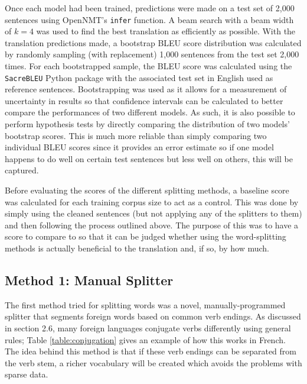\documentclass[11pt]{article}
\begin{document}
Once each model had been trained, predictions were made on a test set of 2,000 sentences using OpenNMT’s \texttt{infer} function. A beam search with a beam width of $k = 4$ was used to find the best translation as efficiently as possible. With the translation predictions made, a bootstrap BLEU score distribution was calculated by randomly sampling (with replacement) 1,000 sentences from the test set 2,000 times. For each bootstrapped sample, the BLEU score was calculated using the \texttt{SacreBLEU} Python package \citep{post-2018-call} with the associated test set in English used as reference sentences. Bootstrapping was used as it allows for a measurement of uncertainty in results so that confidence intervals can be calculated to better compare the performances of two different models. As such, it is also possible to perform hypothesis tests by directly comparing the distribution of two models’ bootstrap scores. This is much more reliable than simply comparing two individual BLEU scores since it provides an error estimate so if one model happens to do well on certain test sentences but less well on others, this will be captured.

\bigskip

Before evaluating the scores of the different splitting methods, a baseline score was calculated for each training corpus size to act as a control. This was done by simply using the cleaned sentences (but not applying any of the splitters to them) and then following the process outlined above. The purpose of this was to have a score to compare to so that it can be judged whether using the word-splitting methods is actually beneficial to the translation and, if so, by how much.

\subsection{Method 1: Manual Splitter}

The first method tried for splitting words was a novel, manually-programmed splitter that segments foreign words based on common verb endings. As discussed in section 2.6, many foreign languages conjugate verbs differently using general rules; Table \ref{table:conjugation} gives an example of how this works in French. The idea behind this method is that if these verb endings can be separated from the verb stem, a richer vocabulary will be created which avoids the problems with sparse data.

\bigskip
\end{document}
